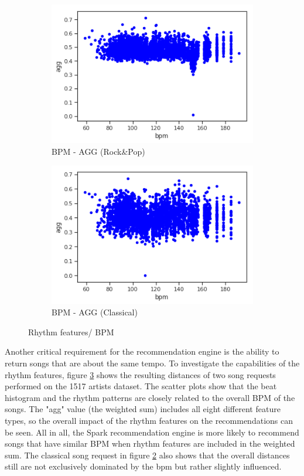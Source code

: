 \begin{figure}[htbp]
{{			\begin{subfigure}{.495\textwidth}
				\centering			
				\includegraphics[scale=0.5]{Images/SparkFeat/bpm_agg_hip.png}	
				\caption{BPM - AGG (Rock\&Pop)}
				\label{fig:arbpm}
			\end{subfigure}		
			\begin{subfigure}{.495\textwidth}
				\centering			
				\includegraphics[scale=0.5]{Images/SparkFeat/bpm_agg_clas.png}	
				\caption{BPM - AGG (Classical)}
				\label{fig:acbpm}
			\end{subfigure}%
	}}
	\caption{Rhythm features/ BPM}
	\label{fig:rhythmfeat}
\end{figure}
\FloatBarrier

\noindent Another critical requirement for the recommendation engine is the ability to return songs that are about the same tempo. To investigate the capabilities of the rhythm features, figure \ref{fig:rhythmfeat} shows the resulting distances of two song requests performed on the 1517 artists dataset.
\noindent The scatter plots show that the beat histogram and the rhythm patterns are closely related to the overall BPM of the songs. The "agg" value (the weighted sum) includes all eight different feature types, so the overall impact of the rhythm features on the recommendations can be seen. All in all, the Spark recommendation engine is more likely to recommend songs that have similar BPM when rhythm features are included in the weighted sum. The classical song request in figure \ref{fig:acbpm} also shows that the overall distances still are not exclusively dominated by the bpm but rather slightly influenced. 

